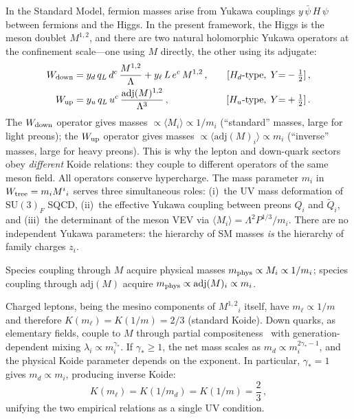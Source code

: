 \documentclass[12pt,a4paper]{article}
\newcommand{\SU}{\mathrm{SU}}
\newcommand{\adj}{\mathrm{adj}}
\begin{document}
In the Standard Model, fermion masses arise from Yukawa couplings
$y\,\bar\psi\,H\,\psi$ between fermions and the Higgs.
In the present framework, the Higgs is the meson doublet $M^{1,2}$,
and there are two natural holomorphic Yukawa operators at the
confinement scale---one using $M$ directly, the other using its
adjugate:
\begin{align}
  W_{\rm down} &= y_d\,q_L\,d^c\,\frac{M^{1,2}}{\Lambda}
  + y_\ell\,L\,e^c\,M^{1,2}\,,
  &\quad [H_d\text{-type},\; Y{=}-\tfrac{1}{2}]\,,
  \label{eq:W1} \\
  W_{\rm up} &= y_u\,q_L\,u^c\,\frac{\adj(M)^{1,2}}{\Lambda^3}\,,
  &\quad [H_u\text{-type},\; Y{=}+\tfrac{1}{2}]\,.
  \label{eq:W2}
\end{align}
The $W_{\rm down}$ operator gives masses $\propto \langle M_i
\rangle \propto 1/m_i$ (``standard'' masses, large for light
preons); the $W_{\rm up}$ operator gives masses $\propto
\langle\adj(M)_i\rangle \propto m_i$ (``inverse'' masses, large
for heavy preons). This is why the lepton and down-quark sectors
obey \emph{different} Koide relations: they couple to different
operators of the same meson field.
All operators conserve hypercharge.
The mass parameter $m_i$ in $W_{\rm tree} = m_i M^i{}_i$ serves three
simultaneous roles: (i)~the UV mass deformation of $\SU(3)_F$ SQCD,
(ii)~the effective Yukawa coupling between preons $Q_i$ and $\tilde Q_i$,
and (iii)~the determinant of the meson VEV via
$\langle M_i\rangle = \Lambda^2 P^{1/3}/m_i$. There are no independent
Yukawa parameters: the hierarchy of SM masses \emph{is} the hierarchy of
family charges $z_i$.

Species coupling through $M$ acquire physical
masses $m_{\rm phys} \propto M_i \propto 1/m_i$; species coupling
through $\adj(M)$ acquire $m_{\rm phys} \propto \adj(M)_i
\propto m_i$.

Charged leptons, being the mesino components of $M^{1,2}{}_i$ itself,
have $m_\ell \propto 1/m$ and therefore $K(m_\ell) = K(1/m) = 2/3$
(standard Koide). Down quarks, as elementary fields, couple to $M$
through partial compositeness~\cite{Kaplan:1991dc} with
generation-dependent mixing $\lambda_i \propto m_i^{\gamma_*}$.
If $\gamma_* \geq 1$, the net mass scales as
$m_d \propto m_i^{2\gamma_*-1}$, and the physical Koide parameter
depends on the exponent. In particular, $\gamma_* = 1$ gives
$m_d \propto m_i$, producing inverse Koide:
\begin{equation}
  K(m_\ell) = K(1/m_d) = K(1/m) = \frac{2}{3}\,,
  \label{eq:koide_duality}
\end{equation}
unifying the two empirical relations as a single UV condition.
\end{document}
